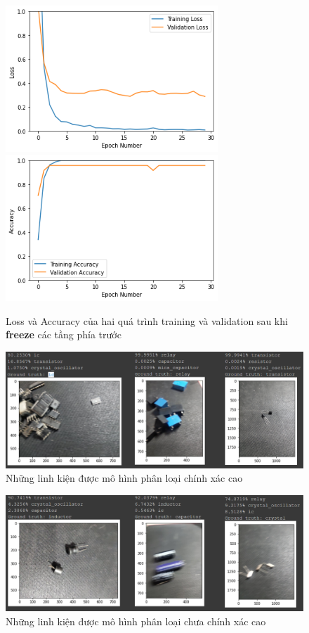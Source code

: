 \documentclass[a4paper]{article}
\begin{document}
\begin{figure}[h!]
\centering
{{\includegraphics[width=8cm]{images/loss1.png} }}
\qquad
{{\includegraphics[width=8cm]{images/acc1.png} }}
\caption*{Loss và Accuracy của hai quá trình training và validation sau khi \textbf{freeze} các tầng phía trước}
\end{figure}

\clearpage

\begin{figure}[h!]
\centering
\includegraphics[width=15cm]{images/result1.PNG}
\caption*{Những linh kiện được mô hình phân loại chính xác cao}
\end{figure}

\begin{figure}[h!]
\centering
\includegraphics[width=15cm]{images/result2.PNG}
\caption*{Những linh kiện được mô hình phân loại chưa chính xác cao}
\end{figure}
\end{document}
